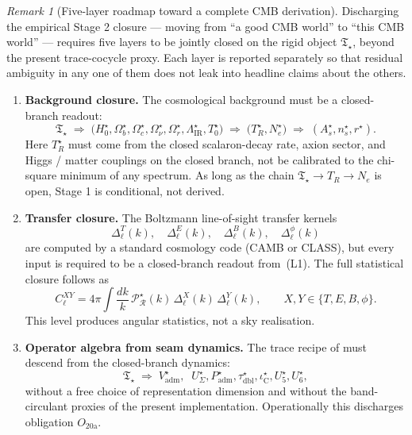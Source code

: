 \documentclass[11pt,a4paper]{article}
\theoremstyle{definition}
\theoremstyle{remark}
\newtheorem*{remark}{Remark}
\newcommand{\taudbl}{\tau_{\mathrm{dbl}}}
\newcommand{\iC}{\iota_{\mathrm C}}
\newcommand{\Padm}{P_{\mathrm{adm}}}
\newcommand{\Tstar}{\mathfrak T_{\star}}
\begin{document}
\begin{remark}[Five-layer roadmap toward a complete CMB derivation]
\label{rem:five-layer-roadmap}
Discharging the empirical Stage 2 closure --- moving from ``a good CMB world'' to ``this CMB
world'' --- requires five layers to be jointly closed on the rigid object $\Tstar$, beyond the
present trace-cocycle proxy. Each layer is reported separately so that residual ambiguity in any
one of them does not leak into headline claims about the others.

\begin{enumerate}[label=(L\arabic*),leftmargin=2.4em,topsep=3pt,itemsep=2pt]
\item \textbf{Background closure.} The cosmological background must be a closed-branch readout:
\[
\Tstar
\;\Longrightarrow\;
\bigl(H_0^\star,\Omega_b^\star,\Omega_c^\star,\Omega_\nu^\star,\Omega_r^\star,
\Lambda_{\mathrm{IR}}^\star,T_0^\star\bigr)
\;\Longrightarrow\;
\bigl(T_R^\star,N_e^\star\bigr)
\;\Longrightarrow\;
(A_s^\star,n_s^\star,r^\star).
\]
Here $T_R^\star$ must come from the closed scalaron-decay rate, axion sector, and Higgs / matter
couplings on the closed branch, not be calibrated to the chi-square minimum of any spectrum. As
long as the chain $\Tstar\to T_R\to N_e$ is open, Stage 1 is conditional, not derived.

\item \textbf{Transfer closure.} The Boltzmann line-of-sight transfer kernels
\[
\Delta_\ell^T(k),\quad
\Delta_\ell^E(k),\quad
\Delta_\ell^B(k),\quad
\Delta_\ell^{\phi}(k)
\]
are computed by a standard cosmology code (CAMB or CLASS), but every input is required to be a
closed-branch readout from~(L1). The full statistical closure follows as
\[
C_\ell^{XY}
=4\pi\int\frac{dk}{k}\,\mathcal P_{\mathcal R}^\star(k)\,
\Delta_\ell^X(k)\,\Delta_\ell^Y(k),
\qquad X,Y\in\{T,E,B,\phi\}.
\]
This level produces angular statistics, not a sky realisation.

\item \textbf{Operator algebra from seam dynamics.} The trace recipe of
 must descend from the closed-branch dynamics:
\[
\Tstar
\;\Longrightarrow\;
V_{\mathrm{adm}}^\star,\;\;
U_\Sigma^\star,\Padm^\star,\taudbl^\star,\iC^\star,U_5^\star,U_6^\star,
\]
without a free choice of representation dimension and without the band-circulant proxies of the
present implementation. Operationally this discharges obligation $O_{20\mathrm{a}}$.


\end{enumerate}
\end{remark}
\end{document}
